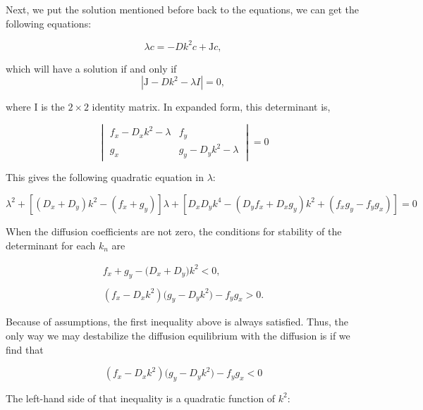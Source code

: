 \documentclass[12pt]{article}
\begin{document}
\noindent Next, we put the solution mentioned before back to the equations, we can get the following equations:
\vspace{12pt}

$$
\lambda c = -Dk^2c + \text{J}c,
$$
\vspace{12pt}

\noindent which will have a solution if and only if 
\vspace{12pt}
$$
|\mathrm{J}-Dk^2-\lambda I|=0,
$$
\vspace{12pt}

\noindent where I is the $2\times2$ identity matrix. In expanded form, this determinant is,
\vspace{12pt}

$$
\begin{vmatrix}f_x-D_xk^2-\lambda&f_y\\ g_x&g_y-D_yk^2-\lambda\end{vmatrix}=0
$$
\vspace{12pt}

\noindent This gives the following quadratic equation in $\lambda$:
\vspace{12pt}

$$
\lambda^2+\left[\left(D_{x}+D_{y}\right)k^2-\left(f_{x}+g_{y}\right)\right]\lambda+\left[D_{x}D_{y}k^4-\left(D_{y}f_{x}+D_{x}g_y\right)k^2+\left(f_{x}g_{y}-f_{y}g_{x}\right)\right]=0\quad
$$
\vspace{12pt}

\noindent When the diffusion coefficients are not zero, the conditions for stability of the determinant for each $k_n$ are
\vspace{12pt}

$$
\begin{array}{l}f_x+g_y-\big(D_x+D_y\big)k^2<0,\\ \\ (f_x-D_x k^2)\big(g_y-D_y k^2\big)-f_y g_x>0.\end{array}
$$
\vspace{12pt}

\noindent Because of assumptions, the first inequality above is always satisfied. Thus, the only way we may destabilize the diffusion equilibrium with the diffusion is if we find that
\vspace{12pt}

$$
(f_x-D_x k^2)\big(g_y-D_yk^2\big)-f_yg_x<0
$$
\vspace{12pt}

\noindent The left-hand side of that inequality is a quadratic function of $k^2$:
\vspace{12pt}
\end{document}
